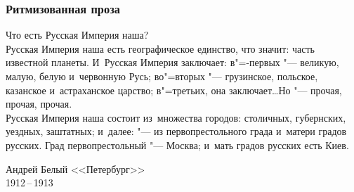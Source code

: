 \documentclass{beamer}
\begin{document}
\begin{frame}
\frametitle{Ритмизованная проза}

\begin{flushleft}
Что есть Русская Империя наша?\\
Русская Империя наша есть географическое единство, что значит: часть известной планеты. И~Русская Империя заключает: в"=-первых "--- великую, малую, белую и~червонную Русь; во"=вторых "--- грузинское, польское, казанское и~астраханское царство; в"=третьих, она заключает\ldots Но "--- прочая, прочая, прочая. \\
Русская Империя наша состоит из~множества городов: столичных, губернских, уездных, заштатных; и~далее: "--- из первопрестольного града и~матери градов русских.
Град первопрестольный "--- Москва; и~мать градов русских есть Киев.
\end{flushleft}

Андрей Белый <<Петербург>>\\
1912\,--\,1913

\end{frame}
\end{document}
